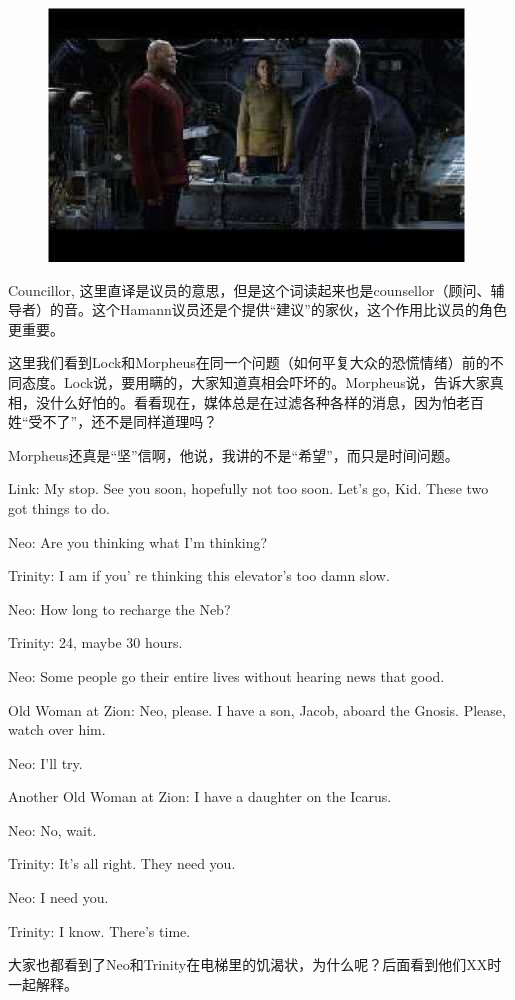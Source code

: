 \documentclass[UTF8]{ctexart}
\newenvironment{myquote}{\color{green} \setlength{\leftskip}{6em} \setlength{\rightskip}{4em} \setlength{\parindent}{-2em}}{\par}
\begin{document}
\begin{figure}[htb]
\centering
\includegraphics[width=0.5\linewidth]{fig/read_reloaded-37}
\end{figure}

Councillor, 这里直译是议员的意思，但是这个词读起来也是counsellor（顾问、辅导者）的音。这个Hamann议员还是个提供“建议”的家伙，这个作用比议员的角色更重要。

这里我们看到Lock和Morpheus在同一个问题（如何平复大众的恐慌情绪）前的不同态度。Lock说，要用瞒的，大家知道真相会吓坏的。Morpheus说，告诉大家真相，没什么好怕的。看看现在，媒体总是在过滤各种各样的消息，因为怕老百姓“受不了”，还不是同样道理吗？

Morpheus还真是“坚”信啊，他说，我讲的不是“希望”，而只是时间问题。

\begin{myquote}
Link: My stop. See you soon, hopefully not too soon. Let's go, Kid. These two got things to do.

Neo: Are you thinking what I'm thinking?

Trinity: I am if you' re thinking this elevator's too damn slow.

Neo: How long to recharge the Neb?

Trinity: 24, maybe 30 hours.

Neo: Some people go their entire lives without hearing news that good.

Old Woman at Zion: Neo, please. I have a son, Jacob, aboard the Gnosis. Please, watch over him.

Neo: I'll try.

Another Old Woman at Zion: I have a daughter on the Icarus.

Neo: No, wait.

Trinity: It's all right. They need you.

Neo: I need you.

Trinity: I know. There's time.
\end{myquote}

大家也都看到了Neo和Trinity在电梯里的饥渴状，为什么呢？后面看到他们XX时一起解释。
\end{document}
